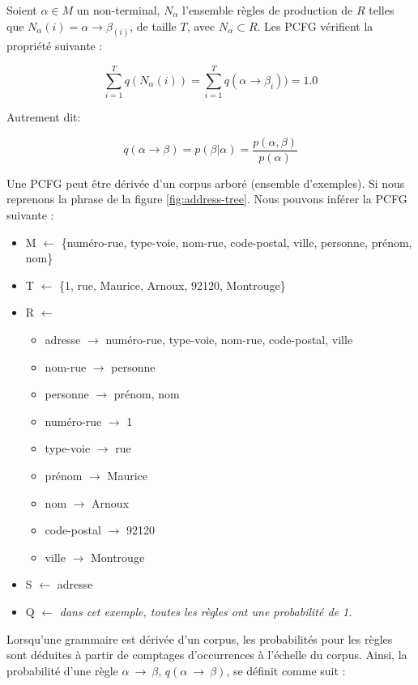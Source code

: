 \documentclass[PhD-Yoann-Dupont.tex]{subfiles}
\begin{document}
Soient $\alpha \in M$ un non-terminal, $N_{\alpha}$ l'ensemble règles de production de $R$ telles que $N_{\alpha}(i) = \alpha \rightarrow \beta_(i)$, de taille $T$, avec $N_{\alpha} \subset R$. Les PCFG vérifient la propriété suivante :

\begin{equation}
\sum_{i=1}^{T} q(N_{\alpha}(i)) = \sum_{i=1}^{T} q(\alpha \rightarrow \beta_{i})) = 1.0
\end{equation}

Autrement dit:

\begin{equation}
q(\alpha \rightarrow \beta) = p(\beta|\alpha) = \frac{p(\alpha,\beta)}{p(\alpha)}
\end{equation}

Une PCFG peut être dérivée d'un corpus arboré (ensemble d'exemples). Si nous reprenons la phrase de la figure \ref{fig:address-tree}. Nous pouvons inférer la PCFG suivante :
\begin{itemize}
\item M $\leftarrow$ \{numéro-rue, type-voie, nom-rue, code-postal, ville, personne, prénom, nom\}
\item T $\leftarrow$ \{1, rue, Maurice, Arnoux, 92120, Montrouge\}
\item R $\leftarrow$
    \begin{itemize}
    \item adresse $\rightarrow$ numéro-rue, type-voie, nom-rue, code-postal, ville
    \item nom-rue $\rightarrow$ personne
    \item personne $\rightarrow$ prénom, nom
    \item numéro-rue $\rightarrow$ 1
    \item type-voie $\rightarrow$ rue
    \item prénom $\rightarrow$ Maurice
    \item nom $\rightarrow$ Arnoux
    \item code-postal $\rightarrow$ 92120
    \item ville $\rightarrow$ Montrouge
    \end{itemize}
\item S $\leftarrow$ adresse
\item Q $\leftarrow$ \textcolor{green!60!black}{\textit{dans cet exemple, toutes les règles ont une probabilité de 1.}}
\end{itemize}

Lorsqu'une grammaire est dérivée d'un corpus, les probabilités pour les règles sont déduites à partir de comptages d'occurrences à l'échelle du corpus. Ainsi, la probabilité d'une règle $\alpha\ \rightarrow\ \beta$, $q(\alpha\ \rightarrow\ \beta)$, se définit comme suit :
\end{document}
